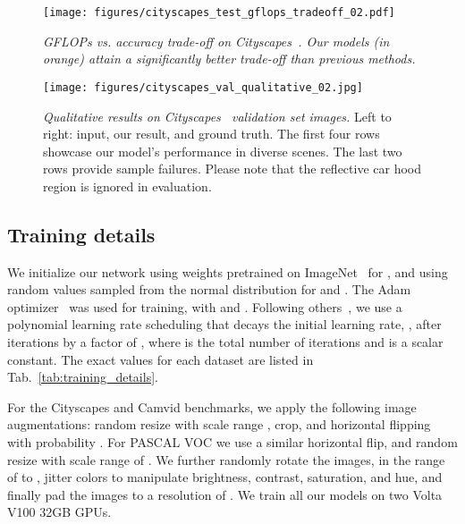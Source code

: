 \documentclass[final]{cvpr}
\begin{document}
\begin{figure}[t]
\centering
\texttt{[image: figures/cityscapes\_test\_gflops\_tradeoff\_02.pdf]}\vspace{0mm}
\caption{
\emph{GFLOPs vs. accuracy trade-off on Cityscapes~\cite{cordts2016cityscapes}. Our models (in orange) attain a significantly better trade-off than previous methods.}
\vspace{-4mm}
}
\label{fig:cityscapes_test_gflops_tradeoff}
\end{figure}


\begin{figure*}[t]
\centering
\texttt{[image: figures/cityscapes\_val\_qualitative\_02.jpg]}\vspace{0mm}
\caption{
\emph{Qualitative results on Cityscapes~\cite{cordts2016cityscapes} validation set images.} Left to right: input, our result, and ground truth. The first four rows showcase our model's performance in diverse scenes. The last two rows provide sample failures. Please note that the reflective car hood region is ignored in evaluation. \vspace{-3mm}
}
\label{fig:cityscapes_val_qualitative}
\end{figure*}

\subsection{Training details}
\label{subsec:Training details}
We initialize our network using weights pretrained on ImageNet~\cite{russakovsky2015imagenet} for , and using random values sampled from the normal distribution for  and . The Adam optimizer~\cite{kingma2014adam} was used for training, with  and . Following others~\cite{chen2017rethinking,chen2018encoder}, we use a polynomial learning rate scheduling that decays the initial learning rate, , after  iterations by a factor of , where  is the total number of iterations and  is a scalar constant. The exact values for each dataset are listed in Tab.~\ref{tab:training_details}. 



For the Cityscapes and Camvid benchmarks, we apply the following image augmentations: random resize with scale range , crop, and horizontal flipping with probability . For PASCAL VOC we use a similar horizontal flip, and random resize with scale range of . We further randomly rotate the images, in the range of  to , jitter colors to manipulate brightness, contrast, saturation, and hue, and finally pad the images to a resolution of . We train all our models on two Volta V100 32GB GPUs.
\end{document}

